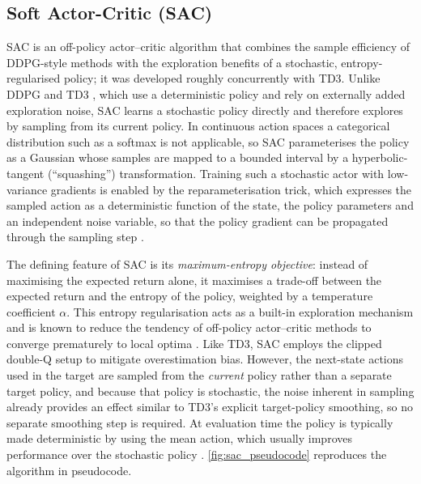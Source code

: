 \subsection{Soft Actor-Critic (SAC)}
\label{subsec:theory_sac}
\ac{SAC} \cite{haarnoja_soft_2018} is an off-policy actor--critic algorithm that combines the sample efficiency of \ac{DDPG}-style methods with the exploration benefits of a stochastic, entropy-regularised policy; it was developed roughly concurrently with \ac{TD3}. Unlike \ac{DDPG} \cite{lillicrap_continuous_2019} and \ac{TD3} \cite{fujimoto_addressing_2018}, which use a deterministic policy and rely on externally added exploration noise, \ac{SAC} learns a stochastic policy directly and therefore explores by sampling from its current policy. In continuous action spaces a categorical distribution such as a softmax is not applicable, so \ac{SAC} parameterises the policy as a Gaussian whose samples are mapped to a bounded interval by a hyperbolic-tangent (``squashing'') transformation. Training such a stochastic actor with low-variance gradients is enabled by the reparameterisation trick, which expresses the sampled action as a deterministic function of the state, the policy parameters and an independent noise variable, so that the policy gradient can be propagated through the sampling step \cite{openai_soft_nodate, haarnoja_soft_2018}.

The defining feature of \ac{SAC} is its \emph{maximum-entropy objective}: instead of maximising the expected return alone, it maximises a trade-off between the expected return and the entropy of the policy, weighted by a temperature coefficient $\alpha$. This entropy regularisation acts as a built-in exploration mechanism and is known to reduce the tendency of off-policy actor--critic methods to converge prematurely to local optima \cite{openai_soft_nodate}. Like \ac{TD3}, \ac{SAC} employs the clipped double-Q setup to mitigate overestimation bias. However, the next-state actions used in the target are sampled from the \emph{current} policy rather than a separate target policy, and because that policy is stochastic, the noise inherent in sampling already provides an effect similar to \ac{TD3}'s explicit target-policy smoothing, so no separate smoothing step is required. At evaluation time the policy is typically made deterministic by using the mean action, which usually improves performance over the stochastic policy \cite{openai_soft_nodate, haarnoja_soft_2018}. \autoref{fig:sac_pseudocode} reproduces the algorithm in pseudocode.

